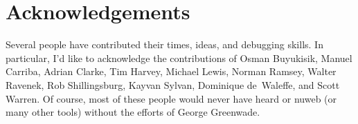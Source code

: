 \section{Acknowledgements}

Several people have contributed their times, ideas, and debugging
skills. In particular, I'd like to acknowledge the contributions of
Osman Buyukisik, Manuel Carriba, Adrian Clarke, Tim Harvey, Michael
Lewis, Norman Ramsey, Walter Ravenek, Rob Shillingsburg, Kayvan
Sylvan, Dominique de~Waleffe, and Scott Warren.  Of course, most of
these people would never have heard or nuweb (or many other tools)
without the efforts of George Greenwade.






